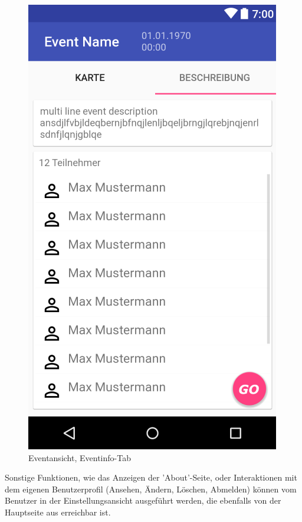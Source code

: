 \documentclass[parskip=full]{scrartcl}
\begin{document}
\begin{figure}[H]
\begin{minipage}[b]{0.4\textwidth}
    \includegraphics[width=\textwidth]{GUI/AndroidStudio/event_info_teilnehmer.PNG}
	\caption{Eventansicht, Eventinfo-Tab}\label{goinfo}
  \end{minipage}
  \vspace{1cm}
\end{figure}

Sonstige Funktionen, wie das Anzeigen der 'About'-Seite, oder Interaktionen mit dem eigenen Benutzerprofil (Ansehen, Ändern, Löschen, Abmelden) können vom Benutzer in der Einstellungsansicht ausgeführt werden, die ebenfalls von der Hauptseite aus erreichbar ist.
\end{document}
